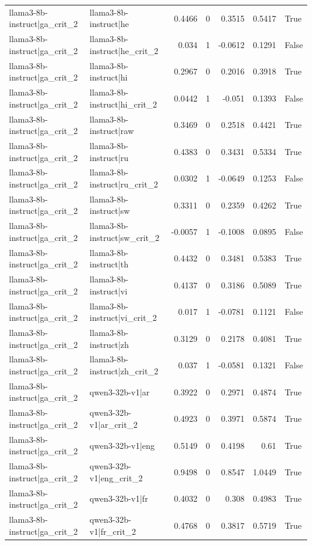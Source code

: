 \begin{table}
\begin{tabular}{l l r r r r l}
llama3-8b-instruct|ga_crit_2 & llama3-8b-instruct|he & 0.4466 & 0 & 0.3515 & 0.5417 & True \\
llama3-8b-instruct|ga_crit_2 & llama3-8b-instruct|he_crit_2 & 0.034 & 1 & -0.0612 & 0.1291 & False \\
llama3-8b-instruct|ga_crit_2 & llama3-8b-instruct|hi & 0.2967 & 0 & 0.2016 & 0.3918 & True \\
llama3-8b-instruct|ga_crit_2 & llama3-8b-instruct|hi_crit_2 & 0.0442 & 1 & -0.051 & 0.1393 & False \\
llama3-8b-instruct|ga_crit_2 & llama3-8b-instruct|raw & 0.3469 & 0 & 0.2518 & 0.4421 & True \\
llama3-8b-instruct|ga_crit_2 & llama3-8b-instruct|ru & 0.4383 & 0 & 0.3431 & 0.5334 & True \\
llama3-8b-instruct|ga_crit_2 & llama3-8b-instruct|ru_crit_2 & 0.0302 & 1 & -0.0649 & 0.1253 & False \\
llama3-8b-instruct|ga_crit_2 & llama3-8b-instruct|sw & 0.3311 & 0 & 0.2359 & 0.4262 & True \\
llama3-8b-instruct|ga_crit_2 & llama3-8b-instruct|sw_crit_2 & -0.0057 & 1 & -0.1008 & 0.0895 & False \\
llama3-8b-instruct|ga_crit_2 & llama3-8b-instruct|th & 0.4432 & 0 & 0.3481 & 0.5383 & True \\
llama3-8b-instruct|ga_crit_2 & llama3-8b-instruct|vi & 0.4137 & 0 & 0.3186 & 0.5089 & True \\
llama3-8b-instruct|ga_crit_2 & llama3-8b-instruct|vi_crit_2 & 0.017 & 1 & -0.0781 & 0.1121 & False \\
llama3-8b-instruct|ga_crit_2 & llama3-8b-instruct|zh & 0.3129 & 0 & 0.2178 & 0.4081 & True \\
llama3-8b-instruct|ga_crit_2 & llama3-8b-instruct|zh_crit_2 & 0.037 & 1 & -0.0581 & 0.1321 & False \\
llama3-8b-instruct|ga_crit_2 & qwen3-32b-v1|ar & 0.3922 & 0 & 0.2971 & 0.4874 & True \\
llama3-8b-instruct|ga_crit_2 & qwen3-32b-v1|ar_crit_2 & 0.4923 & 0 & 0.3971 & 0.5874 & True \\
llama3-8b-instruct|ga_crit_2 & qwen3-32b-v1|eng & 0.5149 & 0 & 0.4198 & 0.61 & True \\
llama3-8b-instruct|ga_crit_2 & qwen3-32b-v1|eng_crit_2 & 0.9498 & 0 & 0.8547 & 1.0449 & True \\
llama3-8b-instruct|ga_crit_2 & qwen3-32b-v1|fr & 0.4032 & 0 & 0.308 & 0.4983 & True \\
llama3-8b-instruct|ga_crit_2 & qwen3-32b-v1|fr_crit_2 & 0.4768 & 0 & 0.3817 & 0.5719 & True \\

\end{tabular}
\end{table}
